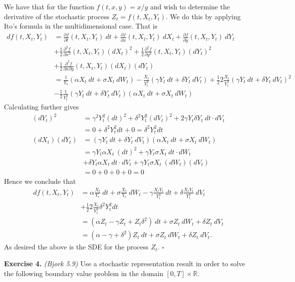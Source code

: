 \documentclass[a4paper,12pt,openany]{book}
\begin{document}
We have that for the function \(f(t,x,y)=x/y\) and wish to determine the derivative of the stochastic process \(Z_t=f(t,X_t,Y_t)\). We do this by applying Ito's formula in the multidimensional case. That is
\begin{align*}
df(t,X_t,Y_t)&=\frac{\partial f}{\partial t}(t,X_t,Y_t)\ dt + \frac{\partial f}{\partial x}(t,X_t,Y_t)\ dX_t + \frac{\partial f}{\partial y}(t,X_t,Y_t)\ dY_t\\
&+\frac{1}{2}\frac{\partial^2 f}{\partial x^2}(t,X_t,Y_t)(dX_t)^2 + \frac{1}{2}\frac{\partial^2 f}{\partial y^2}(t,X_t,Y_t)(dY_t)^2\\
&+\frac{1}{2}\frac{\partial^2 f}{\partial x\partial y}(t,X_t,Y_t)(dX_t)(dY_t)\\
&=\frac{1}{Y_t}(\alpha X_t\ dt + \sigma X_t\ dW_t)-\frac{X_t}{Y_t^2}(\gamma Y_t\ dt+\delta Y_t\ dV_t)+\frac{1}{2}2\frac{X_t}{Y_t^3}(\gamma Y_t\ dt+\delta Y_t\ dV_t)^2\\
&-\frac{1}{2}\frac{1}{Y_t^2}(\gamma Y_t\ dt+\delta Y_t\ dV_t)(\alpha X_t\ dt + \sigma X_t\ dW_t)
\end{align*}
Calculating further gives
\begin{align*}
(dY_t)^2&=\gamma^2 Y_t^2 (dt)^2+\delta^2Y_t^2 (dV_t)^2+2\gamma Y_t\delta Y_t\ dt\cdot dV_t\\
&=0 +\delta^2Y_t^2 dt + 0=\delta^2Y_t^2 dt\\
(dX_t)(dY_t)&=(\gamma Y_t\ dt+\delta Y_t\ dV_t)(\alpha X_t\ dt + \sigma X_t\ dW_t)\\
&=\gamma Y_t \alpha X_t\ (dt)^2 +\gamma Y_t\sigma X_t\ dt\cdot dW_t\\
&+\delta Y_t \alpha X_t\ dt\cdot dV_t+\gamma Y_t\sigma X_t\ (dW_t)(dV_t)\\
&=0+0+0+0=0
\end{align*}
Hence we conclude that
\begin{align*}
df(t,X_t,Y_t)&=\alpha\frac{X_t}{Y_t}\ dt + \sigma \frac{X_t}{Y_t}\ dW_t-\gamma \frac{X_tY_t}{Y_t^2}\ dt+\delta \frac{X_tY_t}{Y_t^2}\ dV_t\\
&+\frac{1}{2}2\frac{X_t}{Y_t^3}\delta^2Y_t^2 dt\\
&=\left(\alpha Z_t-\gamma Z_t+Z_t\delta^2\right)\ dt+ \sigma Z_t\ dW_t+\delta Z_t\ dV_t\\
&=\left(\alpha -\gamma +\delta^2\right)Z_t\ dt+ \sigma Z_t\ dW_t+\delta Z_t\ dV_t.
\end{align*}
As desired the above is the SDE for the process \(Z_t\). \(\square\)

\textbf{Exercise 4.} \emph{(Bjork 5.9)} Use a stochastic representation result in order to solve the following boundary value problem in the domain \([0,T]\times\mathbb{R}\).
\end{document}

